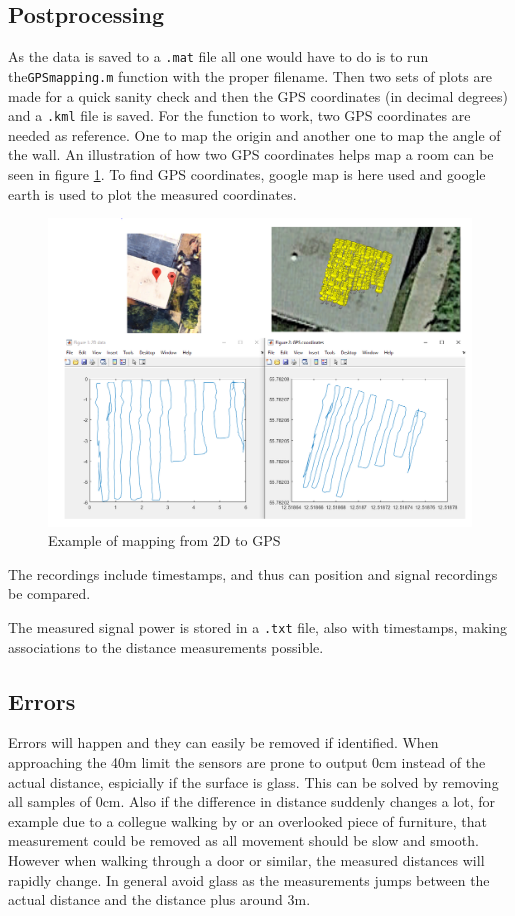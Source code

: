 \documentclass[a4paper,twoside, 12pt]{article}
\begin{document}
\subsection{Postprocessing}
As the data is saved to a \texttt{.mat} file all one would have to do is to run the\texttt{GPSmapping.m} function with the proper filename. Then two sets of plots are made for a quick sanity check and then the GPS coordinates (in decimal degrees) and a \texttt{.kml} file is saved. For the function to work, two GPS coordinates are needed as reference. One to map the origin and another one to map the angle of the wall. An illustration of how two GPS coordinates helps map a room can be seen in figure \ref{fig:map}. To find GPS coordinates, google map is here used and google earth is used to plot the measured coordinates.

\begin{figure}[ht]
\centering
\includegraphics[width=\textwidth]{plotexample.png}
\caption{Example of mapping from 2D to GPS}
\label{fig:map}
\end{figure}

The recordings include timestamps, and thus can position and signal recordings be compared.

The measured signal power is stored in a \texttt{.txt} file, also with timestamps, making associations to the distance measurements possible. 

\subsection{Errors}
Errors will happen and they can easily be removed if identified. When approaching the 40m limit the sensors are prone to output 0cm instead of the actual distance, espicially if the surface is glass. This can be solved by removing all samples of 0cm. Also if the difference in distance suddenly changes a lot, for example due to a collegue walking by or an overlooked piece of furniture, that measurement could be removed as all movement should be slow and smooth. However when walking through a door or similar, the measured distances will rapidly change. In general avoid glass as the measurements jumps between the actual distance and the distance plus around 3m.
\end{document}
